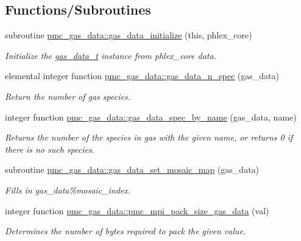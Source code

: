 \subsection*{Functions/\+Subroutines}
\begin{DoxyCompactItemize}
\item 
subroutine \mbox{\hyperlink{namespacepmc__gas__data_af46c599614532ddd2e6741a0a7bed14e}{pmc\+\_\+gas\+\_\+data\+::gas\+\_\+data\+\_\+initialize}} (this, phlex\+\_\+core)
\begin{DoxyCompactList}\small\item\em Initialize the \mbox{\hyperlink{structpmc__gas__data_1_1gas__data__t}{gas\+\_\+data\+\_\+t}} instance from phlex\+\_\+core data. \end{DoxyCompactList}\item 
elemental integer function \mbox{\hyperlink{namespacepmc__gas__data_a6d07e1703ded54713052541e011ecd9f}{pmc\+\_\+gas\+\_\+data\+::gas\+\_\+data\+\_\+n\+\_\+spec}} (gas\+\_\+data)
\begin{DoxyCompactList}\small\item\em Return the number of gas species. \end{DoxyCompactList}\item 
integer function \mbox{\hyperlink{namespacepmc__gas__data_abda315c8ecc2afa6bc10d648140c4258}{pmc\+\_\+gas\+\_\+data\+::gas\+\_\+data\+\_\+spec\+\_\+by\+\_\+name}} (gas\+\_\+data, name)
\begin{DoxyCompactList}\small\item\em Returns the number of the species in gas with the given name, or returns 0 if there is no such species. \end{DoxyCompactList}\item 
subroutine \mbox{\hyperlink{namespacepmc__gas__data_afb086646f86c38de197f098dafac1ddb}{pmc\+\_\+gas\+\_\+data\+::gas\+\_\+data\+\_\+set\+\_\+mosaic\+\_\+map}} (gas\+\_\+data)
\begin{DoxyCompactList}\small\item\em Fills in gas\+\_\+data\%mosaic\+\_\+index. \end{DoxyCompactList}\item 
integer function \mbox{\hyperlink{namespacepmc__gas__data_a53801cb841f5a4c6fe9618de7e33637f}{pmc\+\_\+gas\+\_\+data\+::pmc\+\_\+mpi\+\_\+pack\+\_\+size\+\_\+gas\+\_\+data}} (val)
\begin{DoxyCompactList}\small\item\em Determines the number of bytes required to pack the given value. \end{DoxyCompactList}\item 

\end{DoxyCompactItemize}
